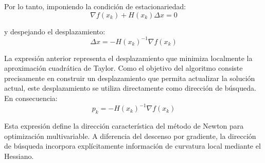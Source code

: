 Por lo tanto, imponiendo la condición de estacionariedad:
\[
\nabla f(x_k)
+
H(x_k)\Delta x
=
0
\]

y despejando el desplazamiento:
\[
\Delta x
=
-H(x_k)^{-1}\nabla f(x_k)
\]

La expresión anterior representa el desplazamiento que minimiza localmente la aproximación cuadrática de Taylor. Como el objetivo del algoritmo consiste precisamente en construir un desplazamiento que permita actualizar la solución actual, este desplazamiento se utiliza directamente como dirección de búsqueda. En consecuencia:
\[
p_k
=
-H(x_k)^{-1}\nabla f(x_k)
\]

Esta expresión define la dirección característica del método de Newton para optimización multivariable. A diferencia del descenso por gradiente, la dirección de búsqueda incorpora explícitamente información de curvatura local mediante el Hessiano.